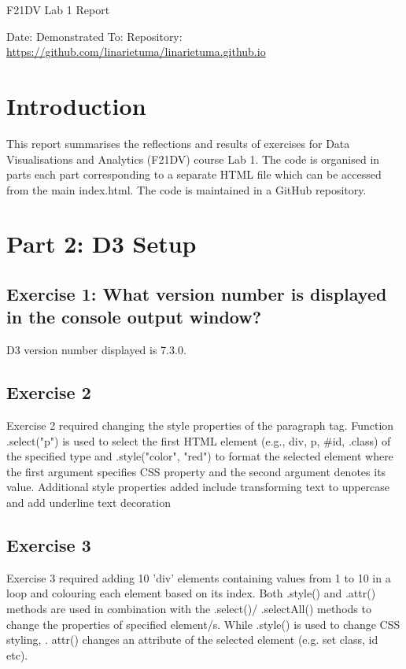 \documentclass[11pt]{article}   	%
\begin{document}
\begin{center}
  \Huge{F21DV Lab 1 Report}
\end{center}
Date:  \linebreak
Demonstrated To: \linebreak
Repository: \url{https://github.com/linarietuma/linarietuma.github.io} 

\section{Introduction}

This report summarises the reflections and results of exercises for Data Visualisations and Analytics (F21DV) course Lab 1. The code is organised in parts each part corresponding to a separate HTML file which can be accessed from the main index.html. The code is maintained in a GitHub repository.

\section{Part 2: D3 Setup}
\subsection{Exercise 1: What version number is displayed in the console output window?}

D3 version number displayed is 7.3.0.

\subsection{Exercise 2 }

Exercise 2 required changing the style properties of the paragraph tag. Function .select("p") is used to select the first HTML element (e.g., div, p, \#id, .class) of the specified type and .style("color", "red") to format the selected element where the first argument specifies CSS property and the second argument denotes its value. Additional style properties added include transforming text to uppercase and add underline text decoration

\subsection{Exercise 3 }

Exercise 3 required adding 10 'div' elements containing values from 1 to 10 in a loop and colouring each element based on its index. 
Both .style() and .attr() methods are used in combination with the .select()/ .selectAll() methods to change the properties of specified element/s. While .style() is used to change CSS styling, . attr() changes an attribute of the selected element (e.g. set class, id etc).
\end{document}
